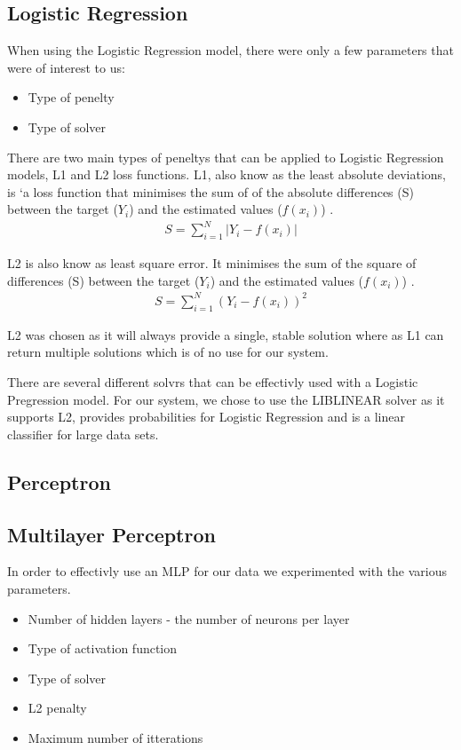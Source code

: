 \documentclass[bsc,frontabs,twoside,singlespacing,parskip,deptreport]{infthesis}     %
\begin{document}
 \subsection{Logistic Regression}
 When using the Logistic Regression model, there were only a few parameters that were of interest to us:
 \begin{itemize}
   \item Type of penelty
   \item Type of solver
 \end{itemize}

 There are two main types of peneltys that can be applied to Logistic Regression models, L1 and L2 loss functions.
 L1, also know as  the least absolute deviations, is `a loss function that minimises the sum of of the absolute
 differences (S) between the target ($Y_i$) and the estimated values ($f(x_{i})$) \cite{l1l2}.
 \begin{eqnarray}
   S = \sum_{i=1}^{N} | Y_i - f(x_i)|\nonumber
   \end{eqnarray}
 
 L2 is also know as least square error. It minimises the sum of the square of differences (S) between
 the target ($Y_i$) and the estimated values ($f(x_{i})$) \cite{l1l2}.
 \begin{eqnarray}
   S = \sum_{i=1}^{N} ( Y_i - f(x_i))^2\nonumber
   \end{eqnarray}

 L2 was chosen as it will always provide a single, stable solution where as L1 can return multiple solutions
 which is of no use for our system.

 There are several different solvrs that can be effectivly used with a Logistic Pregression model.
 For our system, we chose to use the LIBLINEAR solver as it supports L2, provides probabilities
 for Logistic Regression and is a linear classifier for large data sets\cite{fan2008liblinear}.
 
 \subsection{Perceptron}

 
 \subsection{Multilayer Perceptron}
 In order to effectivly use an MLP for our data we experimented with the various parameters.
 \begin{itemize}
 \item Number of hidden layers - the number of neurons per layer
 \item Type of activation function
 \item Type of solver
 \item L2 penalty
 \item Maximum number of itterations
 \end{itemize}
 
\end{document}
